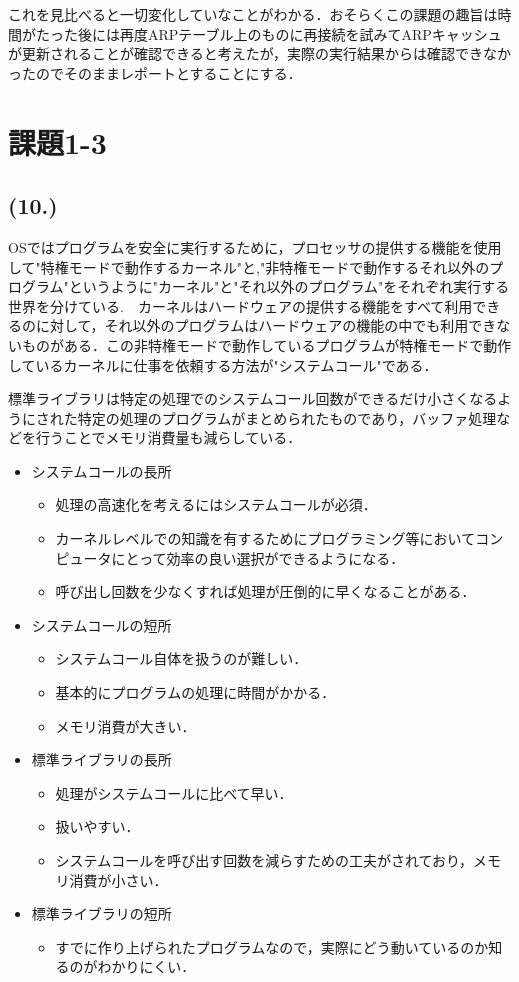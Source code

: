 \documentclass[a4j]{jarticle}
\newenvironment{ite}{\begin{itemize}}{\end{itemize}} %
\begin{document}
これを見比べると一切変化していなことがわかる．おそらくこの課題の趣旨は時間がたった後には再度ARPテーブル上のものに再接続を試みてARPキャッシュが更新されることが確認できると考えたが，実際の実行結果からは確認できなかったのでそのままレポートとすることにする．

\section{課題1-3}

\subsection{(10.)}

OSではプログラムを安全に実行するために，プロセッサの提供する機能を使用して"特権モードで動作するカーネル"と,"非特権モードで動作するそれ以外のプログラム"というように"カーネル"と"それ以外のプログラム"をそれぞれ実行する世界を分けている.　カーネルはハードウェアの提供する機能をすべて利用できるのに対して，それ以外のプログラムはハードウェアの機能の中でも利用できないものがある．この非特権モードで動作しているプログラムが特権モードで動作しているカーネルに仕事を依頼する方法が"システムコール"である．

標準ライブラリは特定の処理でのシステムコール回数ができるだけ小さくなるようにされた特定の処理のプログラムがまとめられたものであり，バッファ処理などを行うことでメモリ消費量も減らしている．

\begin{ite}
\item システムコールの長所
\begin{ite}
\item 処理の高速化を考えるにはシステムコールが必須．
\item カーネルレベルでの知識を有するためにプログラミング等においてコンピュータにとって効率の良い選択ができるようになる．
\item 呼び出し回数を少なくすれば処理が圧倒的に早くなることがある．
\end{ite}
\item システムコールの短所
\begin{ite}
\item システムコール自体を扱うのが難しい．
\item 基本的にプログラムの処理に時間がかかる．
\item メモリ消費が大きい．
\end{ite}
\item 標準ライブラリの長所
\begin{ite}
\item 処理がシステムコールに比べて早い．
\item 扱いやすい．
\item システムコールを呼び出す回数を減らすための工夫がされており，メモリ消費が小さい．
\end{ite}
\item 標準ライブラリの短所
\begin{ite}
\item すでに作り上げられたプログラムなので，実際にどう動いているのか知るのがわかりにくい．
\end{ite}
\end{ite}
\end{document}
